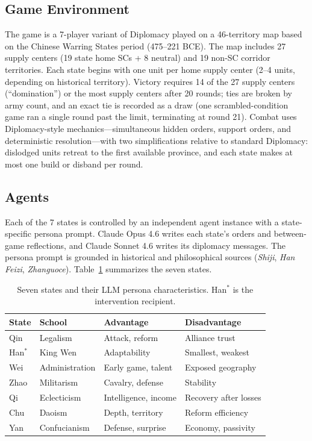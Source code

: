 \documentclass[11pt]{article}
\begin{document}
\subsection{Game Environment}

The game is a 7-player variant of Diplomacy played on a 46-territory map based on the Chinese Warring States period (475--221 BCE). The map includes 27 supply centers (19 state home SCs + 8 neutral) and 19 non-SC corridor territories. Each state begins with one unit per home supply center (2--4 units, depending on historical territory). Victory requires 14 of the 27 supply centers (``domination'') or the most supply centers after 20 rounds; ties are broken by army count, and an exact tie is recorded as a draw (one scrambled-condition game ran a single round past the limit, terminating at round 21). Combat uses Diplomacy-style mechanics---simultaneous hidden orders, support orders, and deterministic resolution---with two simplifications relative to standard Diplomacy: dislodged units retreat to the first available province, and each state makes at most one build or disband per round.

\subsection{Agents}

Each of the 7 states is controlled by an independent agent instance with a state-specific persona prompt. Claude Opus 4.6 writes each state's orders and between-game reflections, and Claude Sonnet 4.6 writes its diplomacy messages. The persona prompt is grounded in historical and philosophical sources (\emph{Shiji}, \emph{Han Feizi}, \emph{Zhanguoce}). Table~\ref{tab:states} summarizes the seven states.

\begin{table}[t]
\centering
\caption{Seven states and their LLM persona characteristics. Han$^*$ is the intervention recipient.}
\label{tab:states}
\begin{tabular}{llll}
\toprule
State & School & Advantage & Disadvantage \\
\midrule
Qin & Legalism & Attack, reform & Alliance trust \\
Han$^*$ & King Wen & Adaptability & Smallest, weakest \\
Wei & Administration & Early game, talent & Exposed geography \\
Zhao & Militarism & Cavalry, defense & Stability \\
Qi & Eclecticism & Intelligence, income & Recovery after losses \\
Chu & Daoism & Depth, territory & Reform efficiency \\
Yan & Confucianism & Defense, surprise & Economy, passivity \\
\bottomrule
\end{tabular}
\end{table}
\end{document}
